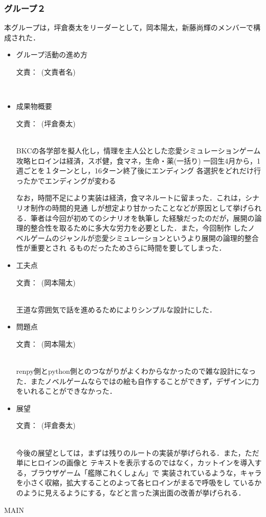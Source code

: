 \documentclass[a4paper]{jarticle}
\newcommand{\resp}[1]{\begin{flushright}文責：~#1\end{flushright}~\\}
\begin{document}
\fi

\subsubsection{グループ２}
    
    本グループは，坪倉奏太をリーダーとして，岡本陽太，新藤尚輝のメンバーで構成された．

    \begin{itemize}
        \item グループ活動の進め方
        
        \resp{(文責者名)}


        \item 成果物概要
        
        \resp{(坪倉奏太)}

        BKCの各学部を擬人化し，情理を主人公とした恋愛シミュレーションゲーム
	攻略ヒロインは経済，スポ健，食マネ，生命・薬(一括り)
	一回生4月から，1週ごとを１ターンとし，16ターン終了後にエンディング
	各選択をどれだけ行ったかでエンディングが変わる

	なお，時間不足により実装は経済，食マネルートに留まった．これは，シナリオ制作の時間的見通	しが想定より甘かったことなどが原因として挙げられる．筆者は今回が初めてのシナリオを執筆し	た経験だったのだが，展開の論理的整合性を取るために多大な労力を必要とした．また，今回制作	したノベルゲームのジャンルが恋愛シミュレーションというより展開の論理的整合性が重要とされ	るものだったためさらに時間を要してしまった．


        \item 工夫点
        
        \resp{(岡本陽太)}

        王道な雰囲気で話を進めるためによりシンプルな設計にした．

        \item 問題点
        
        \resp{(岡本陽太)}

        renpy側とpython側とのつながりがよくわからなかったので雑な設計になった．またノベルゲームならではの絵も自作することができず，デザインに力をいれることができなかった．

        \item 展望
        
        \resp{(坪倉奏太)}

        今後の展望としては，まずは残りのルートの実装が挙げられる．また，ただ単にヒロインの画像と	テキストを表示するのではなく，カットインを導入する，ブラウザゲーム「艦隊これくしょん」で	実装されているような，キャラを小さく収縮，拡大することのよって各ヒロインがまるで呼吸をし	ているかのように見えるようにする，などと言った演出面の改善が挙げられる．

    \end{itemize}

\expandafter\ifx\csname MAIN \endcsname\relax
  
\end{document}
